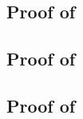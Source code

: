 \subsection{Proof of }
\label{sec:proof-tlr-bb}


\subsection{Proof of }
\label{sec:proof-cond}


\subsection{Proof of }
\label{sec:proof-wi-weak}





